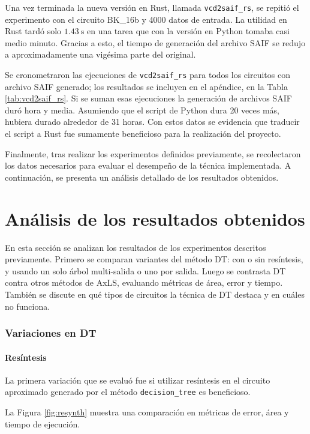 Una vez terminada la nueva versión en Rust, llamada \texttt{vcd2saif\_rs}, se
repitió el experimento con el circuito BK\_16b y \num{4000} datos de entrada.
La utilidad en Rust tardó solo $\SI{1.43}{\second}$ en una tarea que con la
versión en Python tomaba casi medio minuto. Gracias a esto, el tiempo de
generación del archivo SAIF se redujo a aproximadamente una vigésima parte del
original.

Se cronometraron las ejecuciones de \texttt{vcd2saif\_rs} para todos los
circuitos con archivo SAIF generado; los resultados se incluyen en el apéndice,
en la Tabla \ref{tab:vcd2saif_rs}.
Si se suman esas ejecuciones la generación de archivos SAIF duró hora y media.
Asumiendo que el script de Python dura 20 veces más, hubiera durado alrededor
de 31 horas. Con estos datos se evidencia que traducir el script a Rust fue
sumamente beneficioso para la realización del proyecto.

Finalmente, tras realizar los experimentos definidos previamente, se
recolectaron los datos necesarios para evaluar el desempeño de la técnica
implementada. A continuación, se presenta un análisis detallado de los
resultados obtenidos.

\section{Análisis de los resultados obtenidos}

En esta sección se analizan los resultados de los experimentos descritos
previamente. Primero se comparan variantes del método DT: con o sin resíntesis,
y usando un solo árbol multi-salida o uno por salida. Luego se contrasta DT
contra otros métodos de AxLS, evaluando métricas de área, error y tiempo.
También se discute en qué tipos de circuitos la técnica de DT destaca y en
cuáles no funciona.

\subsubsection{Variaciones en DT}

\paragraph{Resíntesis}

La primera variación que se evaluó fue si utilizar resíntesis en el circuito
aproximado generado por el método \texttt{decision\_tree} es beneficioso.

La Figura \ref{fig:resynth} muestra una comparación en métricas de error, área y
tiempo de ejecución.

